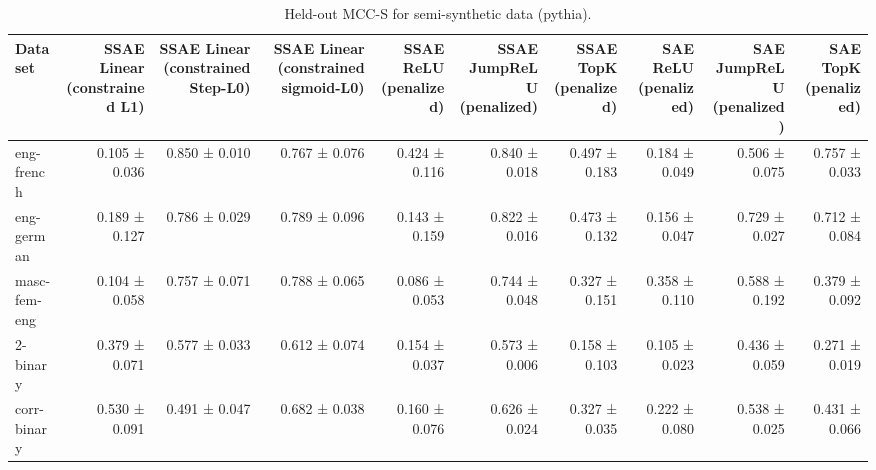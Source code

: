 \begin{table}[t]
\centering
\caption{Held-out MCC-S for semi-synthetic data (pythia).}
\label{tab:semisynthetic-pythia-mcc-s}
\begin{tabular}{lrrrrrrrrr}
\toprule
Dataset & SSAE Linear (constrained L1) & SSAE Linear (constrained Step-L0) & SSAE Linear (constrained sigmoid-L0) & SSAE ReLU (penalized) & SSAE JumpReLU (penalized) & SSAE TopK (penalized) & SAE ReLU (penalized) & SAE JumpReLU (penalized) & SAE TopK (penalized) \\
\midrule
eng-french & 0.105 ± 0.036 & 0.850 ± 0.010 & 0.767 ± 0.076 & 0.424 ± 0.116 & 0.840 ± 0.018 & 0.497 ± 0.183 & 0.184 ± 0.049 & 0.506 ± 0.075 & 0.757 ± 0.033 \\
eng-german & 0.189 ± 0.127 & 0.786 ± 0.029 & 0.789 ± 0.096 & 0.143 ± 0.159 & 0.822 ± 0.016 & 0.473 ± 0.132 & 0.156 ± 0.047 & 0.729 ± 0.027 & 0.712 ± 0.084 \\
masc-fem-eng & 0.104 ± 0.058 & 0.757 ± 0.071 & 0.788 ± 0.065 & 0.086 ± 0.053 & 0.744 ± 0.048 & 0.327 ± 0.151 & 0.358 ± 0.110 & 0.588 ± 0.192 & 0.379 ± 0.092 \\
2-binary & 0.379 ± 0.071 & 0.577 ± 0.033 & 0.612 ± 0.074 & 0.154 ± 0.037 & 0.573 ± 0.006 & 0.158 ± 0.103 & 0.105 ± 0.023 & 0.436 ± 0.059 & 0.271 ± 0.019 \\
corr-binary & 0.530 ± 0.091 & 0.491 ± 0.047 & 0.682 ± 0.038 & 0.160 ± 0.076 & 0.626 ± 0.024 & 0.327 ± 0.035 & 0.222 ± 0.080 & 0.538 ± 0.025 & 0.431 ± 0.066 \\
\bottomrule
\end{tabular}
\end{table}
